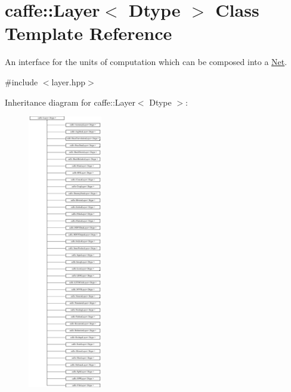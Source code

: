 \hypertarget{classcaffe_1_1Layer}{}\section{caffe\+:\+:Layer$<$ Dtype $>$ Class Template Reference}
\label{classcaffe_1_1Layer}


An interface for the units of computation which can be composed into a \hyperlink{classcaffe_1_1Net}{Net}.  




{\ttfamily \#include $<$layer.\+hpp$>$}

Inheritance diagram for caffe\+:\+:Layer$<$ Dtype $>$\+:\begin{figure}[H]
\begin{center}
\leavevmode
\includegraphics[height=12.000000cm]{classcaffe_1_1Layer}
\end{center}
\end{figure}
